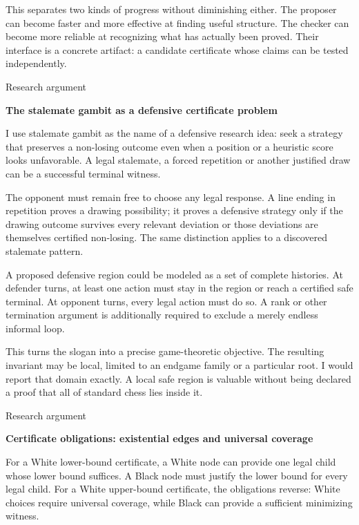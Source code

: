 \documentclass[10pt]{article}
\begin{document}
This separates two kinds of progress without diminishing either. The proposer can become faster and more effective at finding useful structure. The checker can become more reliable at recognizing what has actually been proved. Their interface is a concrete artifact: a candidate certificate whose claims can be tested independently.\par
\clearpage
{\small\color{accent}Research argument}\par
{\LARGE\bfseries\color{ink}The stalemate gambit as a defensive certificate problem}\par\vspace{7pt}
I use stalemate gambit as the name of a defensive research idea: seek a strategy that preserves a non-losing outcome even when a position or a heuristic score looks unfavorable. A legal stalemate, a forced repetition or another justified draw can be a successful terminal witness.\par
The opponent must remain free to choose any legal response. A line ending in repetition proves a drawing possibility; it proves a defensive strategy only if the drawing outcome survives every relevant deviation or those deviations are themselves certified non-losing. The same distinction applies to a discovered stalemate pattern.\par
A proposed defensive region could be modeled as a set of complete histories. At defender turns, at least one action must stay in the region or reach a certified safe terminal. At opponent turns, every legal action must do so. A rank or other termination argument is additionally required to exclude a merely endless informal loop.\par
This turns the slogan into a precise game-theoretic objective. The resulting invariant may be local, limited to an endgame family or a particular root. I would report that domain exactly. A local safe region is valuable without being declared a proof that all of standard chess lies inside it.\par
\clearpage
{\small\color{accent}Research argument}\par
{\LARGE\bfseries\color{ink}Certificate obligations: existential edges and universal coverage}\par\vspace{7pt}
For a White lower-bound certificate, a White node can provide one legal child whose lower bound suffices. A Black node must justify the lower bound for every legal child. For a White upper-bound certificate, the obligations reverse: White choices require universal coverage, while Black can provide a sufficient minimizing witness.\par
\end{document}
